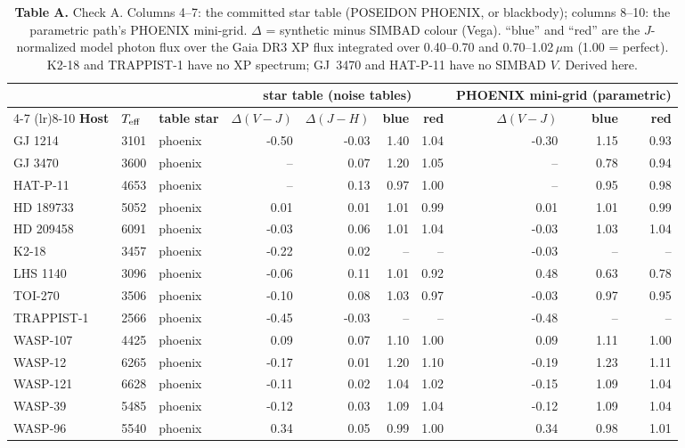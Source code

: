\begin{table}[H]
\centering\footnotesize
\begin{tabular}{@{}lllrrrrrrr@{}}
\toprule
 &  &  & \multicolumn{4}{c}{\textbf{star table (noise tables)}} & \multicolumn{3}{c}{\textbf{PHOENIX mini-grid (parametric)}} \\
\cmidrule(lr){4-7}
\cmidrule(lr){8-10}
\textbf{Host} & \textbf{$T_{\rm eff}$} & \textbf{table star} & \textbf{$\Delta(V{-}J)$} & \textbf{$\Delta(J{-}H)$} & \textbf{blue} & \textbf{red} & \textbf{$\Delta(V{-}J)$} & \textbf{blue} & \textbf{red} \\
\midrule
GJ 1214 & 3101 & phoenix & -0.50 & -0.03 & 1.40 & 1.04 & -0.30 & 1.15 & 0.93 \\
GJ 3470 & 3600 & phoenix & -- & 0.07 & 1.20 & 1.05 & -- & 0.78 & 0.94 \\
HAT-P-11 & 4653 & phoenix & -- & 0.13 & 0.97 & 1.00 & -- & 0.95 & 0.98 \\
HD 189733 & 5052 & phoenix & 0.01 & 0.01 & 1.01 & 0.99 & 0.01 & 1.01 & 0.99 \\
HD 209458 & 6091 & phoenix & -0.03 & 0.06 & 1.01 & 1.04 & -0.03 & 1.03 & 1.04 \\
K2-18 & 3457 & phoenix & -0.22 & 0.02 & -- & -- & -0.03 & -- & -- \\
LHS 1140 & 3096 & phoenix & -0.06 & 0.11 & 1.01 & 0.92 & 0.48 & 0.63 & 0.78 \\
TOI-270 & 3506 & phoenix & -0.10 & 0.08 & 1.03 & 0.97 & -0.03 & 0.97 & 0.95 \\
TRAPPIST-1 & 2566 & phoenix & -0.45 & -0.03 & -- & -- & -0.48 & -- & -- \\
WASP-107 & 4425 & phoenix & 0.09 & 0.07 & 1.10 & 1.00 & 0.09 & 1.11 & 1.00 \\
WASP-12 & 6265 & phoenix & -0.17 & 0.01 & 1.20 & 1.10 & -0.19 & 1.23 & 1.11 \\
WASP-121 & 6628 & phoenix & -0.11 & 0.02 & 1.04 & 1.02 & -0.15 & 1.09 & 1.04 \\
WASP-39 & 5485 & phoenix & -0.12 & 0.03 & 1.09 & 1.04 & -0.12 & 1.09 & 1.04 \\
WASP-96 & 5540 & phoenix & 0.34 & 0.05 & 0.99 & 1.00 & 0.34 & 0.98 & 1.01 \\
\bottomrule
\end{tabular}
\caption*{\footnotesize\textbf{Table A.} Check A. Columns 4--7: the committed star table (POSEIDON PHOENIX, or blackbody); columns 8--10: the parametric path's PHOENIX mini-grid. $\Delta$ = synthetic minus SIMBAD colour (Vega). ``blue'' and ``red'' are the $J$-normalized model photon flux over the Gaia DR3 XP flux integrated over 0.40--0.70 and 0.70--1.02\,$\mu$m (1.00 = perfect). K2-18 and TRAPPIST-1 have no XP spectrum; GJ~3470 and HAT-P-11 have no SIMBAD $V$. Derived here.}
\end{table}
